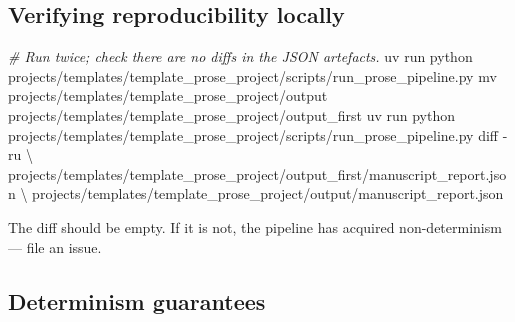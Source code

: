 \documentclass[
  english,
]{article}
\newenvironment{Shaded}{}{}
\newcommand{\AttributeTok}[1]{\textcolor[rgb]{0.49,0.56,0.16}{#1}}
\newcommand{\CommentTok}[1]{\textcolor[rgb]{0.38,0.63,0.69}{\textit{#1}}}
\newcommand{\DataTypeTok}[1]{\textcolor[rgb]{0.56,0.13,0.00}{#1}}
\newcommand{\ExtensionTok}[1]{#1}
\newcommand{\FunctionTok}[1]{\textcolor[rgb]{0.02,0.16,0.49}{#1}}
\newcommand{\NormalTok}[1]{#1}
\begin{document}
\subsection{Verifying reproducibility
locally}\label{verifying-reproducibility-locally}

\begin{Shaded}
\begin{Highlighting}[]
\CommentTok{\# Run twice; check there are no diffs in the JSON artefacts.}
\ExtensionTok{uv}\NormalTok{ run python projects/templates/template\_prose\_project/scripts/run\_prose\_pipeline.py}
\FunctionTok{mv}\NormalTok{ projects/templates/template\_prose\_project/output projects/templates/template\_prose\_project/output\_first}
\ExtensionTok{uv}\NormalTok{ run python projects/templates/template\_prose\_project/scripts/run\_prose\_pipeline.py}
\FunctionTok{diff} \AttributeTok{{-}ru} \DataTypeTok{\textbackslash{}}
\NormalTok{    projects/templates/template\_prose\_project/output\_first/manuscript\_report.json }\DataTypeTok{\textbackslash{}}
\NormalTok{    projects/templates/template\_prose\_project/output/manuscript\_report.json}
\end{Highlighting}
\end{Shaded}

The diff should be empty. If it is not, the pipeline has acquired
non-determinism --- file an issue.

\subsection{Determinism guarantees}\label{determinism-guarantees}
\end{document}
